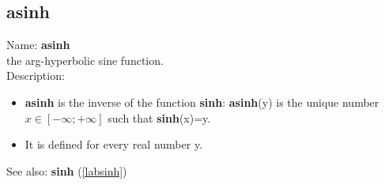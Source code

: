 \subsection{asinh}
\label{labasinh}
\noindent Name: \textbf{asinh}\\
the arg-hyperbolic sine function.\\

\noindent Description: \begin{itemize}

\item \textbf{asinh} is the inverse of the function \textbf{sinh}: \textbf{asinh}(y) is the unique number 
   $x \in [-\infty; +\infty]$ such that \textbf{sinh}(x)=y.

\item It is defined for every real number y.
\end{itemize}
See also: \textbf{sinh} (\ref{labsinh})

